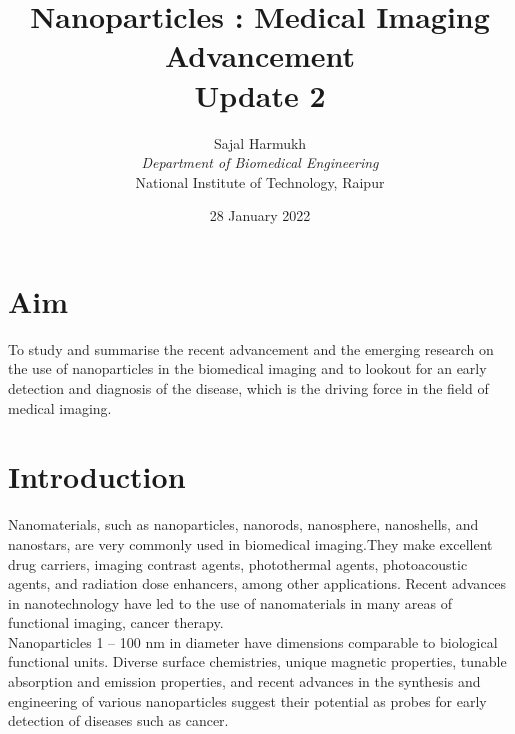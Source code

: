 \documentclass{article}
\title{\textbf{Nanoparticles : Medical Imaging Advancement\\Update 2}}
\author{Sajal Harmukh \\ \textit{Department of Biomedical Engineering} \\ National Institute of Technology, Raipur }
\date{28 January 2022}
\begin{document}
\maketitle

\section*{Aim}
\large
To study and summarise the recent advancement and the emerging research on the use of nanoparticles in the biomedical imaging and to lookout for an early detection and diagnosis of the disease, which is the driving force in the field of medical imaging.

\section*{Introduction}
Nanomaterials, such as nanoparticles, nanorods, nanosphere, nanoshells, and nanostars, are
very commonly used in biomedical imaging.They make excellent drug carriers, imaging contrast agents, photothermal agents, photoacoustic agents, and radiation dose enhancers, among other applications. Recent advances in nanotechnology have led to the use of nanomaterials
in many areas of functional imaging, cancer therapy.\\ Nanoparticles 1 – 100 nm in diameter have dimensions comparable to biological functional units. Diverse surface chemistries, unique magnetic properties, tunable absorption and emission properties, and recent advances in the synthesis and engineering of various nanoparticles suggest their potential as probes for early detection of diseases such as cancer.
 
\end{document}
